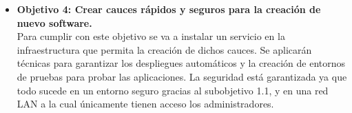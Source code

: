 \begin{text}
\begin{itemize}
		\item \textbf{Objetivo 4: Crear cauces rápidos y seguros para la creación de nuevo software.} \\
		Para cumplir con este objetivo se va a instalar un servicio en la infraestructura que permita la creación de dichos cauces. Se aplicarán técnicas para garantizar los despliegues automáticos y la creación de entornos de pruebas para probar las aplicaciones. La seguridad está garantizada ya que todo sucede en un entorno seguro gracias al subobjetivo 1.1, y en una red LAN a la cual únicamente tienen acceso los administradores.
	\end{itemize}
\end{text}

